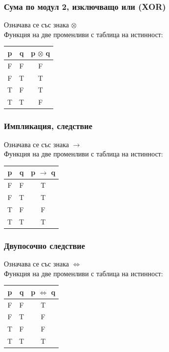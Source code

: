 \documentclass[fleqn, 12pt]{article}
\theoremstyle{definition}
\begin{document}
\newpage

\subsubsection{Сума по модул 2, изключващо или (XOR)}
Означава се със знака $\otimes$\\
Функция на две променливи с таблица на истинност: 
\begin{table}[htp]
  \begin{center}
    \begin{tabular}{|c|c|c|} 
\hline
      \textbf{p} & \textbf{q}  & \textbf{p $\otimes$ q} \\
      \hline
	F & F & F \\
\hline
	F & T & T \\
\hline
	T & F & T \\
\hline
 	T & T & F \\
\hline
    \end{tabular}
  \end{center}
\end{table}

\subsubsection{Импликация, следствие }
Означава се със знака $\to$\\
Функция на две променливи с таблица на истинност: 
\begin{table}[htp]
  \begin{center}
    \begin{tabular}{|c|c|c|} 
\hline
      \textbf{p} & \textbf{q}  & \textbf{p $\to$ q} \\
\hline
	F & F & T \\
 \hline
	F & T & T \\ 
\hline
	T & F & F \\ 
\hline
 	T & T & T \\ 
\hline
    \end{tabular}
  \end{center}
\end{table}

\subsubsection{Двупосочно следствие}
Означава се със знака $\Leftrightarrow$\\
Функция на две променливи с таблица на истинност: 
\begin{table}[htp]
  \begin{center}
    \begin{tabular}{|c|c|c|} 
\hline
      \textbf{p} & \textbf{q}  & \textbf{p $\Leftrightarrow$ q} \\
\hline
	F & F & T \\
\hline
	F & T & F \\
\hline
	T & F & F \\
\hline
 	T & T & T \\
\hline
    \end{tabular}
  \end{center}
\end{table}
\end{document}
